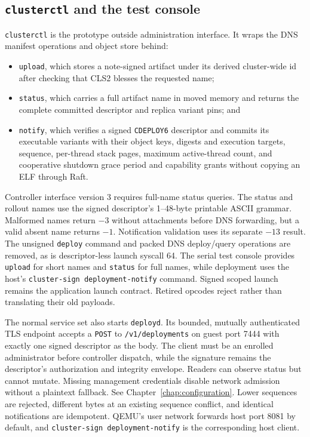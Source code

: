 \subsection{\texttt{clusterctl} and the test console}

\texttt{clusterctl} is the prototype outside administration interface. It
wraps the DNS manifest operations and object store behind:

\begin{itemize}
    \item \texttt{upload}, which stores a note-signed artifact under its
        derived cluster-wide id after checking that CLS2 blesses the requested
        name;
    \item \texttt{status}, which carries a full artifact name in moved memory
        and returns the complete committed descriptor and replica variant pins;
        and
    \item \texttt{notify}, which verifies a signed \texttt{CDEPLOY6}
        descriptor and commits its executable variants with their object keys,
        digests and execution targets, sequence, per-thread stack pages,
        maximum active-thread count, and
        cooperative shutdown grace period and capability grants without
        copying an ELF through Raft.
\end{itemize}

Controller interface version 3 requires full-name status queries. The
status and rollout names use the signed descriptor's 1--48-byte printable
ASCII grammar. Malformed names return $-3$ without attachments before DNS
forwarding, but a valid absent name returns $-1$. Notification validation uses
its separate $-13$ result.
The
unsigned \texttt{deploy} command and packed DNS deploy/query operations are
removed, as is descriptor-less launch syscall 64. The serial test console
provides \texttt{upload} for short names and \texttt{status} for full names, while
deployment uses the host's \texttt{cluster-sign deployment-notify} command.
Signed scoped launch remains the application launch contract. Retired opcodes
reject rather than translating their old payloads.

The normal service set also starts \texttt{deployd}. Its bounded, mutually
authenticated TLS endpoint accepts a \texttt{POST} to
\texttt{/v1/deployments} on guest port 7444 with exactly one signed descriptor
as the body. The client must be an enrolled administrator before controller
dispatch, while the signature remains the descriptor's authorization and integrity
envelope. Readers can observe status but cannot mutate. Missing management
credentials disable network admission without a plaintext fallback. See
Chapter~\ref{chap:configuration}. Lower sequences
are rejected, different bytes at an existing sequence conflict, and identical
notifications are idempotent. QEMU's user network forwards host port 8081 by
default, and \texttt{cluster-sign deployment-notify} is the corresponding host
client.

